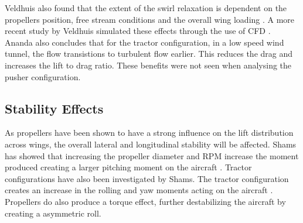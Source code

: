 Veldhuis also found that the extent of the swirl relaxation is dependent on the propellers position, free stream conditions and the overall wing loading \cite{Veldhuis2004}. A more recent study by Veldhuis simulated these effects through the use of CFD \cite{Veldhuis2016}. Ananda also concludes that for the tractor configuration, in a low speed wind tunnel, the flow transistions to turbulent flow earlier. This reduces the drag and increases the lift to drag ratio. These benefits were not seen when analysing the pusher configuration. 


















\subsection{Stability Effects}
As propellers have been shown to have a strong influence on the lift distribution across wings, the overall lateral and longitudinal stability will be affected. Shams has showed that increasing the propeller diameter and RPM increase the moment produced creating a larger pitching moment on the aircraft \cite{Shams2020}. Tractor configurations have also been investigated by Shams. The tractor configuration creates an increase in the rolling and yaw moments acting on the aircraft \cite{Shams2020}. Propellers do also produce a torque effect, further destabilizing the aircraft by creating a asymmetric roll. 

